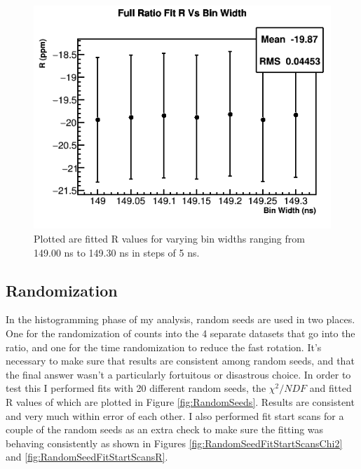 		\begin{figure}[]
			\centering
			\includegraphics[width=.6\textwidth]{BinWidthComparison_R}
		    \caption[BinWidth]{Plotted are fitted R values for varying bin widths ranging from 149.00 ns to 149.30 ns in steps of 5 ns.}
		    \label{fig:BinWidth}
		\end{figure}

	\subsection{Randomization}
	\label{Sec:Randomization}

		In the histogramming phase of my analysis, random seeds are used in two places. One for the randomization of counts into the 4 separate datasets that go into the ratio, and one for the time randomization to reduce the fast rotation. It's necessary to make sure that results are consistent among random seeds, and that the final answer wasn't a particularly fortuitous or disastrous choice. In order to test this I performed fits with 20 different random seeds, the $\chi^{2}/NDF$ and fitted R values of which are plotted in Figure \ref{fig:RandomSeeds}. Results are consistent and very much within error of each other. I also performed fit start scans for a couple of the random seeds as an extra check to make sure the fitting was behaving consistently as shown in Figures \ref{fig:RandomSeedFitStartScansChi2} and \ref{fig:RandomSeedFitStartScansR}.


